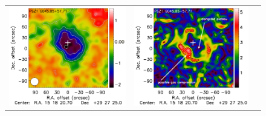 \documentclass[twocolumn,traditabstract]{aa}
\begin{document}
\begin{figure}[p]
{\begin{tabular}{lll}
\includegraphics[trim=0cm 2.2cm 0cm 0cm, clip=true, scale=1]{Figure/Map_PSZ1G045.pdf} & 
\includegraphics[trim=2.3cm 2.2cm 0cm 0cm, clip=true, scale=1]{Figure/Grad_PSZ1G045_15_15_45.pdf} & 

\end{tabular}}
\end{figure}
\end{document}
